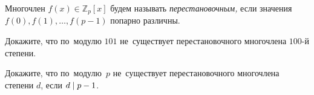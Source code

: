 Многочлен $f(x) \in \mathbb{Z}_p [x]$ будем называть \emph{перестановочным,}
если значения $f(0), f(1), \ldots, f(p-1)$ попарно различны.

\begin{problems}

\item
Докажите, что по~модулю $101$ не~существует перестановочного многочлена
$100$-й степени.

\item
Докажите, что по~модулю~$p$ не~существует перестановочного многочлена
степени $d$, если $d \mathrel{\vert} p - 1$.

\end{problems}

\endgroup %

